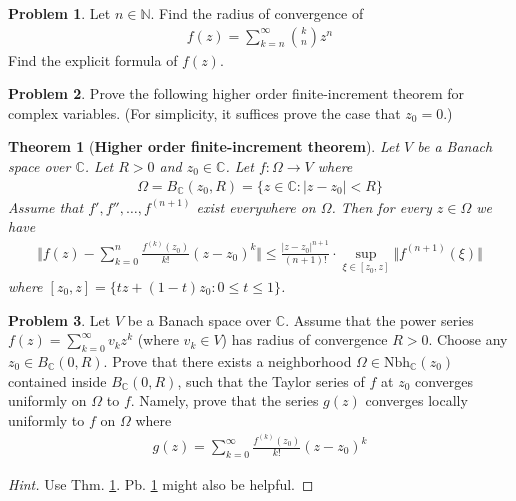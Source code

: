 \documentclass[12pt,b5paper,notitlepage]{article}
\theoremstyle{definition}
\newtheorem{prob}{\color{red}Problem}[section]
\theoremstyle{plain}
\newtheorem{thm}[df]{Theorem}
\newcommand{\Cbb}{\mathbb C}
\newcommand{\Nbb}{\mathbb N}
\newcommand{\Nbh}{\mathrm{Nbh}}
\numberwithin{equation}{section}
\begin{document}
\begin{prob}\label{lb357}
Let $n\in\Nbb$. Find the radius of convergence of
\begin{align}
f(z)=\sum_{k=n}^\infty {k\choose n}z^n
\end{align}
Find the explicit formula of $f(z)$.
\end{prob}



\begin{prob}
Prove the following higher order finite-increment theorem for complex variables. (For simplicity, it suffices prove the case that $z_0=0$.)
\end{prob}

\begin{thm}[\textbf{Higher order finite-increment theorem}]  \label{lb356}
Let $V$ be a Banach space over $\Cbb$. Let $R>0$ and $z_0\in\Cbb$. Let $f:\Omega\rightarrow V$ where
\begin{align*}
\Omega=B_\Cbb(z_0,R)=\{z\in\Cbb:|z-z_0|<R\}
\end{align*}
Assume that $f',f'',\dots,f^{(n+1)}$ exist everywhere on $\Omega$. Then for every $z\in\Omega$ we have
\begin{align}
\Big\Vert f(z)-\sum_{k=0}^n\frac{f^{(k)}(z_0)}{k!}(z-z_0)^k \Big\Vert \leq\frac{|z-z_0|^{n+1}}{(n+1)!}\cdot \sup_{\xi\in[z_0,z]} \Vert f^{(n+1)}(\xi)\Vert
\end{align}
where $[z_0,z]=\{tz+(1-t)z_0:0\leq t\leq 1\}$.
\end{thm}



\begin{prob}
Let $V$ be a Banach space over $\Cbb$. Assume that the power series $f(z)=\sum_{k=0}^\infty v_kz^k$ (where $v_k\in V$) has radius of convergence $R>0$. Choose any $z_0\in B_\Cbb(0,R)$. Prove that there exists a neighborhood $\Omega\in\Nbh_\Cbb(z_0)$ contained inside $B_\Cbb(0,R)$, such that the Taylor series of $f$ at $z_0$ converges uniformly on $\Omega$ to $f$. Namely, prove that the series $g(z)$ converges locally uniformly to $f$ on $\Omega$ where
\begin{align}
g(z)=\sum_{k=0}^\infty\frac{f^{(k)}(z_0)}{k!}(z-z_0)^k
\end{align}
\end{prob}

\begin{proof}[Hint]
Use Thm. \ref{lb356}.  Pb.  \ref{lb357} might also be helpful.
\end{proof}
\end{document}
